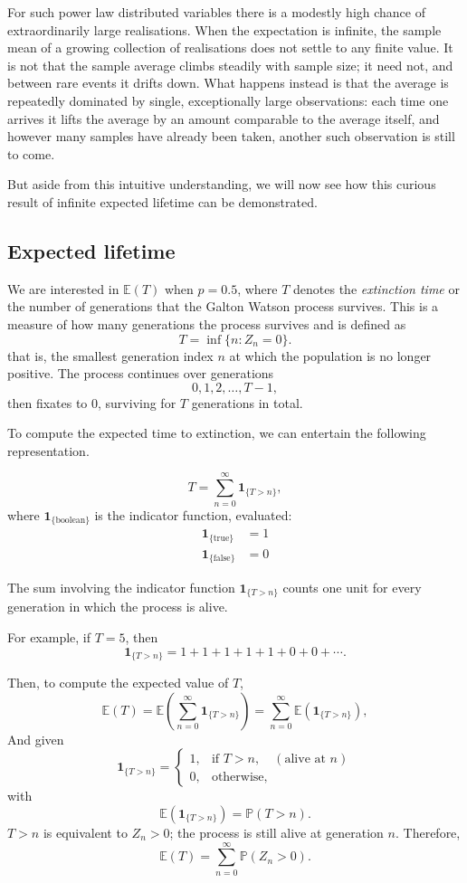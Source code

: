 \documentclass[11pt]{article}
\begin{document}
\noindent
For such power law distributed variables there is a modestly high chance of extraordinarily large realisations.
When the expectation is infinite, the sample mean of a growing collection of realisations does not settle to any finite value.
It is not that the sample average climbs steadily with sample size; it need not, and between rare events it drifts down.
What happens instead is that the average is repeatedly dominated by single, exceptionally large observations: each time one arrives it lifts the average by an amount comparable to the average itself, and however many samples have already been taken, another such observation is still to come.

But aside from this intuitive understanding, we will now see how this curious result of infinite expected lifetime can be demonstrated.

\subsection{Expected lifetime}

We are interested in $\mathbb{E}(T)$ when $p = 0.5$, where $T$ denotes the
\emph{extinction time} or the number of generations that the Galton Watson process survives. This is a measure of how many generations the process
survives and is defined as
\[
T = \inf \{ n : Z_n = 0 \}.
\]
that is, the smallest generation index $n$ at which the population is no longer positive.
The process continues over generations
\[
0, 1, 2, \dots, T-1,
\]
then fixates to 0, surviving for $T$ generations in total.

To compute the expected time to extinction, we can entertain the following representation.

\[
T = \sum_{n=0}^{\infty} \mathbf{1}_{\{ T > n \}},
\]
where $\mathbf{1}_{\{\text{boolean}\}}$ is the indicator function, evaluated:
\begin{align*}
    \mathbf{1}_{\{ \text{true}\}} &= 1 \\
    \mathbf{1}_{\{ \text{false}\}} &= 0
\end{align*}



\noindent
The sum involving the indicator function $\mathbf{1}_{\{T>n\}}$ counts one unit
for every generation in which the process is alive.

For example, if $T = 5$, then
\[
\mathbf{1}_{\{T>n\}} = 1 + 1 + 1 + 1 + 1 + 0 + 0 + \cdots .
\]

\noindent
Then, to compute the expected value of $T$,
\[
\mathbb{E}(T)
= \mathbb{E}\!\left( \sum_{n=0}^{\infty} \mathbf{1}_{\{T>n\} } \right)
= \sum_{n=0}^{\infty} \mathbb{E}\!\left( \mathbf{1}_{\{T>n\}} \right),
\]
And given
\[
\mathbf{1}_{\{T>n\}} =
\begin{cases} 
1, & \text{if } T>n, \quad(\text{alive at } n) \\
0, & \text{otherwise},
\end{cases}
\]
with
\[
\mathbb{E}\!\left( \mathbf{1}_{\{T>n\}} \right)
= \mathbb{P}(T>n).
\]
\noindent
$T>n$ is equivalent to $Z_n>0$; the process is still
alive at generation $n$. Therefore,
\[
\mathbb{E}(T)
= \sum_{n=0}^{\infty} \mathbb{P}(Z_n>0).
\]
\end{document}
